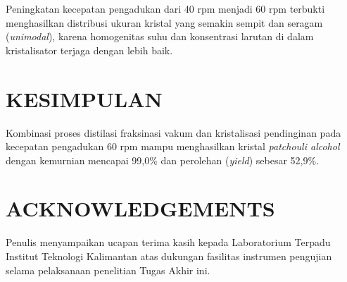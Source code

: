 \documentclass[a4paper,12pt,twoside]{article}
\begin{document}
Peningkatan kecepatan pengadukan dari 40 rpm menjadi 60 rpm terbukti menghasilkan distribusi ukuran kristal yang semakin sempit dan seragam (\textit{unimodal}), karena homogenitas suhu dan konsentrasi larutan di dalam kristalisator terjaga dengan lebih baik.

\section*{KESIMPULAN}
Kombinasi proses distilasi fraksinasi vakum dan kristalisasi pendinginan pada kecepatan pengadukan 60 rpm mampu menghasilkan kristal \textit{patchouli alcohol} dengan kemurnian mencapai 99,0\% dan perolehan (\textit{yield}) sebesar 52,9\%.

\section*{ACKNOWLEDGEMENTS}
Penulis menyampaikan ucapan terima kasih kepada Laboratorium Terpadu Institut Teknologi Kalimantan atas dukungan fasilitas instrumen pengujian selama pelaksanaan penelitian Tugas Akhir ini.

\begin{singlespace}
  
  
\end{singlespace}
\end{document}
